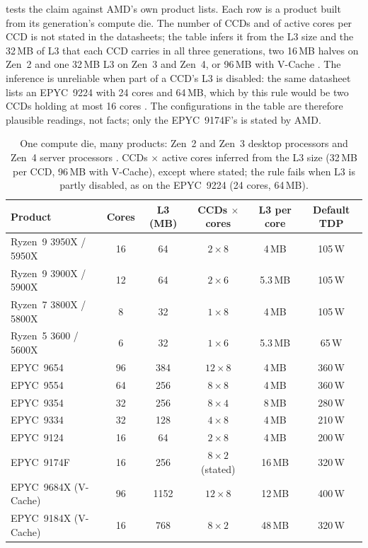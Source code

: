  tests the claim against AMD's own product lists. Each row is a product built from its generation's compute die. The number of CCDs and of active cores per CCD is not stated in the datasheets; the table infers it from the L3 size and the 32\,MB of L3 that each CCD carries in all three generations, two 16\,MB halves on Zen~2 and one 32\,MB L3 on Zen~3 and Zen~4, or 96\,MB with V-Cache \cite{suggs2019zen2,wuu2022vcache,advancedmicrodevicesinc.4thGenAMD2023}. The inference is unreliable when part of a CCD's L3 is disabled: the same datasheet lists an EPYC~9224 with 24 cores and 64\,MB, which by this rule would be two CCDs holding at most 16 cores \cite{advancedmicrodevicesinc.AMDEPYC90042023}. The configurations in the table are therefore plausible readings, not facts; only the EPYC~9174F's is stated by AMD.

\begin{table}[htbp]
  \centering
  \caption[One compute die, many products]{One compute die, many products: Zen~2 and Zen~3 desktop processors \cite{advancedmicrodevicesinc.AMDRyzen30002022} and Zen~4 server processors \cite{advancedmicrodevicesinc.AMDEPYC90042023}. CCDs $\times$ active cores inferred from the L3 size (32\,MB per CCD, 96\,MB with V-Cache), except where stated; the rule fails when L3 is partly disabled, as on the EPYC~9224 (24 cores, 64\,MB).}
  \label{tab:product-matrix}
  \small
  \begin{tabular}{@{}lccccc@{}}
    \toprule
    \textbf{Product} & \textbf{Cores} & \textbf{L3 (MB)} & \textbf{CCDs $\times$ cores} & \textbf{L3 per core} & \textbf{Default TDP} \\
    \midrule
    Ryzen~9 3950X / 5950X & 16 & 64 & $2 \times 8$ & 4\,MB & 105\,W \\
    Ryzen~9 3900X / 5900X & 12 & 64 & $2 \times 6$ & 5.3\,MB & 105\,W \\
    Ryzen~7 3800X / 5800X & 8 & 32 & $1 \times 8$ & 4\,MB & 105\,W \\
    Ryzen~5 3600 / 5600X & 6 & 32 & $1 \times 6$ & 5.3\,MB & 65\,W \\
    \midrule
    EPYC~9654 & 96 & 384 & $12 \times 8$ & 4\,MB & 360\,W \\
    EPYC~9554 & 64 & 256 & $8 \times 8$ & 4\,MB & 360\,W \\
    EPYC~9354 & 32 & 256 & $8 \times 4$ & 8\,MB & 280\,W \\
    EPYC~9334 & 32 & 128 & $4 \times 8$ & 4\,MB & 210\,W \\
    EPYC~9124 & 16 & 64 & $2 \times 8$ & 4\,MB & 200\,W \\
    EPYC~9174F & 16 & 256 & $8 \times 2$ (stated) & 16\,MB & 320\,W \\
    EPYC~9684X (V-Cache) & 96 & 1152 & $12 \times 8$ & 12\,MB & 400\,W \\
    EPYC~9184X (V-Cache) & 16 & 768 & $8 \times 2$ & 48\,MB & 320\,W \\
    \bottomrule
  \end{tabular}
\end{table}

